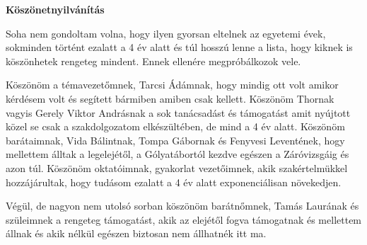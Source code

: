 
\thispagestyle{empty}

\vspace*{\fill}

{\bf \huge {Köszönetnyilvánítás}}

\vspace*{\fill}

Soha nem gondoltam volna, hogy ilyen gyorsan eltelnek az egyetemi évek, sokminden történt ezalatt a 4 év alatt és túl hosszú lenne a lista, hogy kiknek is köszönhetek rengeteg mindent. Ennek ellenére megpróbálkozok vele.

Köszönöm a témavezetőmnek, Tarcsi Ádámnak, hogy mindig ott volt amikor kérdésem volt és segített bármiben amiben csak kellett.
Köszönöm Thornak vagyis Gerely Viktor Andrásnak a sok tanácsadást és támogatást amit nyújtott közel se csak a szakdolgozatom elkészültében, de mind a 4 év alatt.
Köszönöm barátaimnak, Vida Bálintnak, Tompa Gábornak és Fenyvesi Leventének, hogy mellettem álltak a legelejétől, a Gólyatábortól kezdve egészen a Záróvizsgáig és azon túl.
Köszönöm oktatóimnak, gyakorlat vezetőimnek, akik szakértelmükkel hozzájárultak, hogy tudásom ezalatt a 4 év alatt exponenciálisan növekedjen.

Végül, de nagyon nem utolsó sorban köszönöm barátnőmnek, Tamás Laurának és szüleimnek a rengeteg támogatást, akik az elejétől fogva támogatnak és mellettem állnak és akik nélkül egészen biztosan nem állhatnék itt ma.

\vspace*{\fill}
\setcounter{page}{1}
